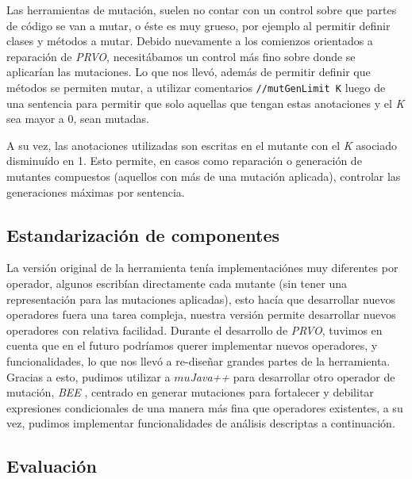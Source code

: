 Las herramientas de mutaci\'on, suelen no contar con un control sobre que partes de c\'odigo se van a mutar, o \'este es muy grueso, por ejemplo al permitir definir clases y m\'etodos a mutar. Debido nuevamente a los comienzos orientados a reparaci\'on de \emph{PRVO}, necesit\'abamos un control m\'as fino sobre donde se aplicar\'ian las mutaciones. Lo que nos llev\'o, adem\'as de permitir definir que m\'etodos se permiten mutar, a utilizar comentarios \lstinline|//mutGenLimit K| luego de una sentencia para permitir que solo aquellas que tengan estas anotaciones y el \emph{K} sea mayor a 0, sean mutadas.

A su vez, las anotaciones utilizadas son escritas en el mutante con el \emph{K} asociado disminu\'ido en 1. Esto permite, en casos como reparaci\'on o generaci\'on de mutantes compuestos (aquellos con m\'as de una mutaci\'on aplicada), controlar las generaciones m\'aximas por sentencia.

\subsection{Estandarizaci\'on de componentes}

La versi\'on original de la herramienta ten\'ia implementaci\'ones muy diferentes por operador, algunos escrib\'ian directamente cada mutante (sin tener una representaci\'on para las mutaciones aplicadas), esto hac\'ia que desarrollar nuevos operadores fuera una tarea compleja, nuestra versi\'on permite desarrollar nuevos operadores con relativa facilidad. Durante el desarrollo de \emph{PRVO}, tuvimos en cuenta que en el futuro podr\'iamos querer implementar nuevos operadores, y funcionalidades, lo que nos llev\'o a re-dise\~nar grandes partes de la herramienta. Gracias a esto, pudimos utilizar a \emph{$mu$Java++} para desarrollar otro operador de mutaci\'on, \emph{BEE} \cite{bibliography.mutation.operators.beeBridaS17}, centrado en generar mutaciones para fortalecer y debilitar expresiones condicionales de una manera m\'as fina que operadores existentes, a su vez, pudimos implementar funcionalidades de an\'alisis descriptas a continuaci\'on.

\subsection{Evaluaci\'on}

